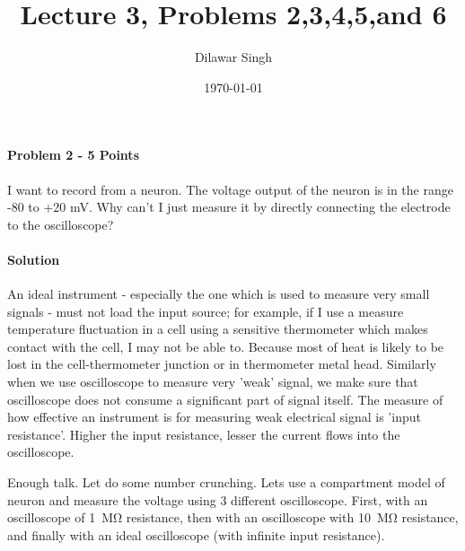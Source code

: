 \documentclass[a4paper,10pt]{article}
\title{Lecture 3, Problems 2,3,4,5,and 6}
\author{Dilawar Singh}
\date{\today}
\begin{document}
\maketitle

\paragraph{Problem 2 - 5 Points}
I want to record from a neuron. The voltage output of the neuron is in the range
-80 to +20 mV. Why can’t I just measure it by directly connecting the electrode
to the oscilloscope?

\paragraph{Solution} An ideal instrument - especially the one which is used to
measure very small signals - must not load the input source; for example, if I
use a measure temperature fluctuation in a cell using a sensitive thermometer
which makes contact with the cell, I may not be able to. Because most of heat is
likely to be lost in the cell-thermometer junction or in thermometer metal head.
Similarly when we use oscilloscope to measure very 'weak' signal, we make sure
that oscilloscope does not consume a significant part of signal itself. The
measure of how effective an instrument is for measuring weak electrical signal
is 'input resistance'. Higher the input resistance, lesser the current flows
into the oscilloscope. 

Enough talk. Let do some number crunching. Lets use a compartment model of
neuron and measure the voltage using 3 different oscilloscope. First, with an
oscilloscope of \SI{1}{\mega \ohm} resistance, then with an oscilloscope with
\SI{10}{\mega \ohm} resistance, and finally with an ideal oscilloscope (with infinite input
resistance). 

\par

\end{document}
